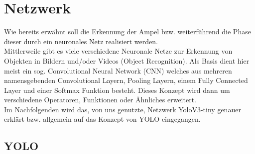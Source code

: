 \documentclass[a4paper,oneside,12pt]{report}
\begin{document}
	\chapter{Netzwerk}
	\begin{onehalfspace}
		Wie bereits erwähnt soll die Erkennung der Ampel bzw. weiterführend die Phase dieser durch ein neuronales Netz realisiert werden.\\
		Mittlerweile gibt es viele verschiedene Neuronale Netze zur Erkennung von Objekten in Bildern und/oder Videos (Object Recognition). Als Basis dient hier meist ein sog. Convolutional Neural Network (CNN) welches aus mehreren namensgebenden Convolutional Layern, Pooling Layern, einem Fully Connected Layer und einer Softmax Funktion besteht.
		Dieses Konzept wird dann um verschiedene Operatoren, Funktionen oder Ähnliches erweitert.\\
		Im Nachfolgenden wird das, von uns genutzte, Netzwerk YoloV3-tiny genauer erklärt bzw. allgemein auf das Konzept von YOLO eingegangen.
		\section{YOLO}

\end{onehalfspace}
\end{document}
